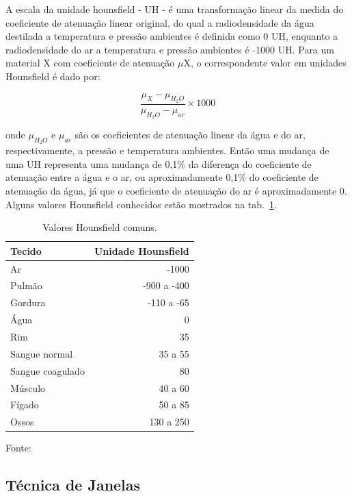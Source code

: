 A escala da unidade hounsfield - UH - é uma transformação linear da medida do coeficiente de atenuação linear original, do qual a radiodensidade da água destilada a temperatura e pressão ambientes é definida como 0 UH, enquanto a radiodensidade do ar a temperatura e pressão ambientes é -1000 UH. Para um material X com coeficiente de atenuação $\mu$X, o correspondente valor em unidades Hounsfield é dado por:

\begin{equation}
	\frac{\mu_X-\mu_{H_2O}}{\mu_{H_2O}-\mu_{ar}}\times 1000
\end{equation}

onde $\mu_{H_2O}$ e $\mu_{ar}$ são os coeficientes de atenuação linear da água e do ar, respectivamente, a pressão e temperatura ambientes. Então uma mudança de uma UH representa uma mudança de 0,1\% da diferença do coeficiente de atenuação entre a água e o ar, ou aproximadamente 0,1\% do coeficiente de atenuação da água, já que o coeficiente de atenuação do ar é aproximadamente 0. Alguns valores Hounsfield conhecidos estão mostrados na tab.~\ref{tab:hounsfield}.

\begin{table}
 \caption{Valores Hounsfield comuns.}
 \begin{center}
 \begin{tabular}{l|r}
 \hline
 	\textbf{Tecido} & \textbf{Unidade Hounsfield} \\ \hline
 	Ar & -1000 \\
 	Pulmão & -900 a -400 \\
 	Gordura & -110 a -65 \\
 	Água & 0 \\
 	Rim & 35 \\
 	Sangue normal & 35 a 55 \\
 	Sangue coagulado & 80 \\
 	Músculo & 40 a 60 \\
 	Fígado & 50 a 85 \\
 	Ossos & 130 a 250 \\
 \hline
 \end{tabular}
 \end{center}
 \begin{description}
  \item Fonte: \citealt{oliveira}
 \end{description}
 \label{tab:hounsfield}
\end{table}

\subsection{Técnica de Janelas}

